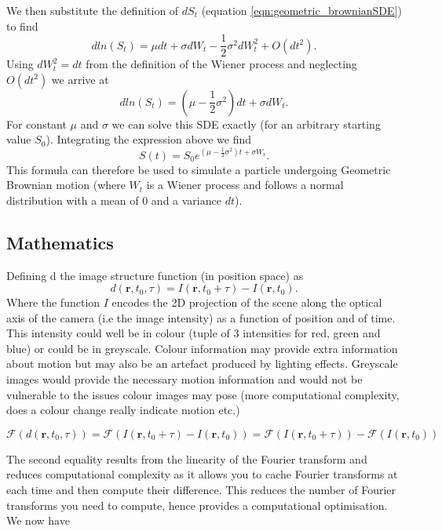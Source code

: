 \documentclass[11pt]{article}
\begin{document}
We then substitute the definition of $dS_t$ (equation \ref{eqn:geometric_brownianSDE}) to find
\begin{equation}
dln(S_t) = \mu dt + \sigma dW_t - \frac{1}{2} \sigma^2 dW_t^2 + O(dt^2).
\end{equation}
Using $dW_t^2 = dt$ from the definition of the Wiener process and neglecting $O(dt^2)$ we arrive at
\begin{equation}
dln(S_t) = (\mu - \frac{1}{2} \sigma^2) dt + \sigma dW_t.
\end{equation}
For constant $\mu$ and $\sigma$ we can solve this SDE exactly (for an arbitrary starting value $S_0$). Integrating the expression above we find
\begin{equation}
\label{eqn:geometric_brownian_equation}
S(t) = S_0 e^{(\mu - \frac{1}{2} \sigma^2) t + \sigma W_t}.
\end{equation}
This formula can therefore be used to simulate a particle undergoing Geometric Brownian motion (where $W_t$ is a Wiener process and follows a normal distribution with a mean of 0 and a variance $dt$).

\subsection{Mathematics}
Defining d the image structure function (in position space) as
\begin{equation}
    d(\textbf{r}, t_0, \tau) = I(\mathbf{r}, t_0 + \tau) - I(\mathbf{r}, t_0).
\end{equation}
Where the function $\textit{I}$ encodes the 2D projection of the scene along the optical axis of the camera (i.e the image intensity) as a function of position and of time.
This intensity could well be in colour (tuple of 3 intensities for red, green and blue) or could be in greyscale. Colour information may provide extra information about motion but may also be an artefact produced by lighting effects. Greyscale images would provide the necessary motion information and would not be vulnerable to the issues colour images may pose (more computational complexity, does a colour change really indicate motion etc.)

\begin{equation}
    \mathscr{F} (d(\textbf{r}, t_0, \tau) ) = \mathscr{F} (I(\mathbf{r}, t_0 + \tau) - I(\mathbf{r}, t_0)) = \mathscr{F}(I(\mathbf{r}, t_0 + \tau)) - \mathscr{F}(I(\mathbf{r}, t_0))
\end{equation}

The second equality results from the linearity of the Fourier transform and reduces computational complexity as it allows you to cache Fourier transforms at each time and then compute their difference.
This reduces the number of Fourier transforms you need to compute, hence provides a computational optimisation.\cite{ddm2}
We now have
\end{document}
